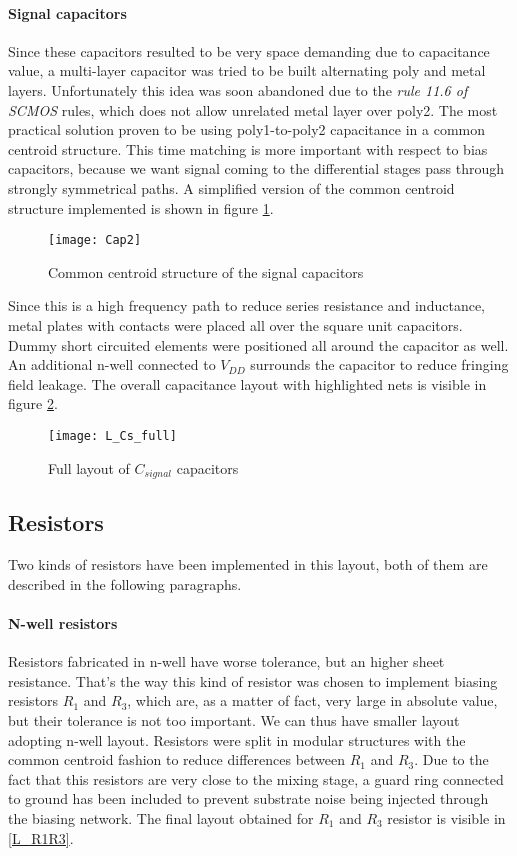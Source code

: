 \paragraph{Signal capacitors}
Since these capacitors resulted to be very space demanding due to capacitance value, a multi-layer capacitor was tried to be built alternating poly and metal layers. Unfortunately this idea was soon abandoned due to the \emph{rule 11.6 of SCMOS} rules, which does not allow unrelated metal layer over poly2. The most practical solution proven to be using poly1-to-poly2 capacitance in a common centroid structure. This time matching is more important with respect to bias capacitors, because we want signal coming to the differential stages pass through strongly symmetrical paths.
A simplified version of the common centroid structure implemented is shown in figure \ref{Cap2}. 
\begin{figure}[H]
	\centering
	\texttt{[image: Cap2]}
	\caption{Common centroid structure of the signal capacitors}
	\label{Cap2}
\end{figure}
Since this is a high frequency path to reduce series resistance and inductance, metal plates with contacts were placed all over the square unit capacitors. Dummy short circuited elements were positioned all around the capacitor as well. An additional n-well connected to \(V_{DD}\) surrounds the capacitor to reduce fringing field leakage. The overall capacitance layout with highlighted nets is visible in figure \ref{L_Cs_full}.
\begin{figure}[H]
	\centering
	\texttt{[image: L\_Cs\_full]}
	\caption{Full layout of \(C_{signal}\) capacitors}
	\label{L_Cs_full}
\end{figure}

\subsection{Resistors}
Two kinds of resistors have been implemented in this layout, both of them are described in the following paragraphs.
\paragraph{N-well resistors}
Resistors fabricated in n-well have worse tolerance, but an higher sheet resistance. That's the way this kind of resistor was chosen to implement biasing resistors \(R_1\) and \(R_3\), which are, as a matter of fact, very large in absolute value, but their tolerance is not too important. We can thus have smaller layout adopting n-well layout. Resistors were split in modular structures with the common centroid fashion to reduce differences between \(R_1\) and \(R_3\). Due to the fact that this resistors are very close to the mixing stage, a guard ring connected to ground has been included to prevent substrate noise being injected through the biasing network. The final layout obtained for \(R_1\) and \(R_3\) resistor is visible in \ref{L_R1R3}.
 
